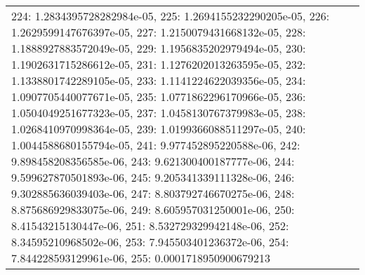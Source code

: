 \begin{tabular}{lrl}
224: 1.2834395728282984e-05, 225: 1.2694155232290205e-05, 226: 1.2629599147676397e-05, 227: 1.2150079431668132e-05, 228: 1.1888927883572049e-05, 229: 1.1956835202979494e-05, 230: 1.1902631715286612e-05, 231: 1.1276202013263595e-05, 232: 1.1338801742289105e-05, 233: 1.1141224622039356e-05, 234: 1.0907705440077671e-05, 235: 1.0771862296170966e-05, 236: 1.0504049251677323e-05, 237: 1.0458130767379983e-05, 238: 1.0268410970998364e-05, 239: 1.0199366088511297e-05, 240: 1.0044588680155794e-05, 241: 9.977452895220588e-06, 242: 9.898458208356585e-06, 243: 9.621300400187777e-06, 244: 9.599627870501893e-06, 245: 9.205341339111328e-06, 246: 9.302885636039403e-06, 247: 8.803792746670275e-06, 248: 8.875686929833075e-06, 249: 8.605957031250001e-06, 250: 8.41543215130447e-06, 251: 8.532729329942148e-06, 252: 8.34595210968502e-06, 253: 7.945503401236372e-06, 254: 7.844228593129961e-06, 255: 0.0001718950900679213} \\
\end{tabular}

